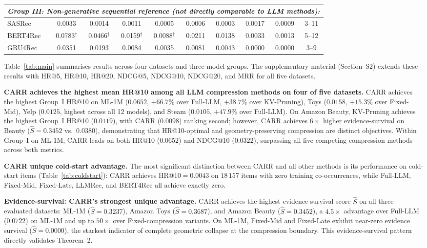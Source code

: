 \documentclass[lettersize,journal]{IEEEtran}
\begin{document}
\begin{table}[!t]
\begin{tabular}{l|cc|cc|cc|cc|c}
\midrule
\multicolumn{10}{l}{\textit{Group III: Non-generative sequential reference (not directly comparable to LLM methods):}} \\
\midrule
SASRec & 0.0033 & 0.0014 & 0.0011 & 0.0005 & 0.0006 & 0.0003 & 0.0017 & 0.0009 & 3--11 \\
BERT4Rec & 0.0783$^\dagger$ & 0.0466$^\dagger$ & 0.0159$^\dagger$ & 0.0088$^\dagger$ & 0.0211 & 0.0138 & 0.0033 & 0.0013 & 5--12 \\
GRU4Rec & 0.0351 & 0.0193 & 0.0084 & 0.0035 & 0.0081 & 0.0043 & 0.0000 & 0.0000 & 3--9 \\
\bottomrule
\end{tabular}
\end{table}

Table~\ref{tab:main} summarises results across four datasets and three model groups. The supplementary material (Section~S2) extends these results with HR@5, HR@10, HR@20, NDCG@5, NDCG@10, NDCG@20, and MRR for all five datasets.

\textbf{CARR achieves the highest mean HR@10 among all LLM compression methods on four of five datasets.} CARR achieves the highest Group~I HR@10 on ML-1M ($0.0652$, $+66.7\%$ over Full-LLM, $+38.7\%$ over KV-Pruning), Toys ($0.0158$, $+15.3\%$ over Fixed-Mid), Yelp ($0.0125$, highest across all 12 models), and Steam ($0.0105$, $+47.9\%$ over Full-LLM). On Amazon Beauty, KV-Pruning achieves the highest Group~I HR@10 ($0.0119$), with CARR ($0.0098$) ranking second; however, CARR achieves $6\times$ higher evidence-survival on Beauty ($\widehat{S}=0.3452$ vs.~$0.0380$), demonstrating that HR@10-optimal and geometry-preserving compression are distinct objectives. Within Group~I on ML-1M, CARR leads on both HR@10 ($0.0652$) and NDCG@10 ($0.0322$), surpassing all five competing compression methods across both metrics.

\textbf{CARR unique cold-start advantage.} The most significant distinction between CARR and all other methods is its performance on cold-start items (Table~\ref{tab:coldstart}): CARR achieves HR@10$=0.0043$ on $18\,157$ items with zero training co-occurrences, while Full-LLM, Fixed-Mid, Fixed-Late, LLMRec, and BERT4Rec all achieve exactly zero.

\textbf{Evidence-survival: CARR's strongest unique advantage.} CARR achieves the highest evidence-survival score $\widehat{S}$ on all three evaluated datasets: ML-1M ($\widehat{S}=0.3237$), Amazon Toys ($\widehat{S}=0.3687$), and Amazon Beauty ($\widehat{S}=0.3452$), a $4.5\times$ advantage over Full-LLM ($0.0722$) on ML-1M and up to $50\times$ over Fixed-compression variants. On ML-1M, Fixed-Mid and Fixed-Late exhibit near-zero evidence survival ($\widehat{S}=0.0000$), the starkest indicator of complete geometric collapse at the compression boundary. This evidence-survival pattern directly validates Theorem~2.
\end{document}

